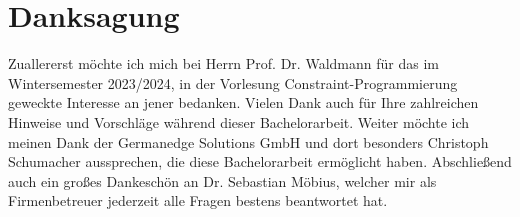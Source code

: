 \chapter*{Danksagung}
\label{sec:Danksagung}

Zuallererst möchte ich mich bei Herrn Prof. Dr. Waldmann für das im Wintersemester 2023/2024,
in der Vorlesung Constraint-Programmierung geweckte Interesse an jener bedanken.
Vielen Dank auch für Ihre zahlreichen Hinweise und Vorschläge während dieser Bachelorarbeit.
Weiter möchte ich meinen Dank der Germanedge Solutions GmbH und dort besonders Christoph Schumacher aussprechen,
die diese Bachelorarbeit ermöglicht haben.
Abschließend auch ein großes Dankeschön an Dr. Sebastian Möbius, welcher mir als Firmenbetreuer jederzeit alle
Fragen bestens beantwortet hat.